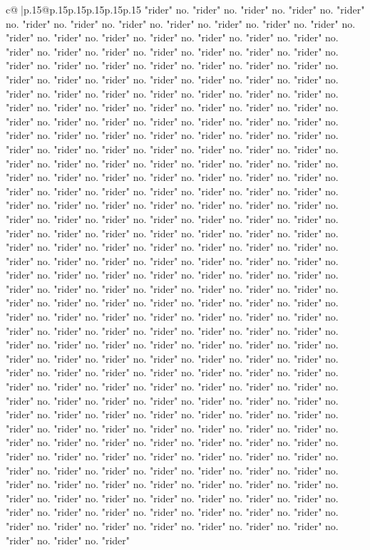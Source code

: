 \documentclass{article}
\begin{document}
{\begin{supertabular}{c@{$\;$}|p{.15\linewidth}@{}p{.15\linewidth}p{.15\linewidth}p{.15\linewidth}p{.15\linewidth}p{.15\linewidth}}
{{{"rider" no. "rider" no. "rider" no. "rider" no. "rider" no. "rider" no. "rider" no. "rider" no. "rider" no. "rider" no. "rider" no. "rider" no. "rider" no. "rider" no. "rider" no. "rider" no. "rider" no. "rider" no. "rider" no. "rider" no. "rider" no. "rider" no. "rider" no. "rider" no. "rider" no. "rider" no. "rider" no. "rider" no. "rider" no. "rider" no. "rider" no. "rider" no. "rider" no. "rider" no. "rider" no. "rider" no. "rider" no. "rider" no. "rider" no. "rider" no. "rider" no. "rider" no. "rider" no. "rider" no. "rider" no. "rider" no. "rider" no. "rider" no. "rider" no. "rider" no. "rider" no. "rider" no. "rider" no. "rider" no. "rider" no. "rider" no. "rider" no. "rider" no. "rider" no. "rider" no. "rider" no. "rider" no. "rider" no. "rider" no. "rider" no. "rider" no. "rider" no. "rider" no. "rider" no. "rider" no. "rider" no. "rider" no. "rider" no. "rider" no. "rider" no. "rider" no. "rider" no. "rider" no. "rider" no. "rider" no. "rider" no. "rider" no. "rider" no. "rider" no. "rider" no. "rider" no. "rider" no. "rider" no. "rider" no. "rider" no. "rider" no. "rider" no. "rider" no. "rider" no. "rider" no. "rider" no. "rider" no. "rider" no. "rider" no. "rider" no. "rider" no. "rider" no. "rider" no. "rider" no. "rider" no. "rider" no. "rider" no. "rider" no. "rider" no. "rider" no. "rider" no. "rider" no. "rider" no. "rider" no. "rider" no. "rider" no. "rider" no. "rider" no. "rider" no. "rider" no. "rider" no. "rider" no. "rider" no. "rider" no. "rider" no. "rider" no. "rider" no. "rider" no. "rider" no. "rider" no. "rider" no. "rider" no. "rider" no. "rider" no. "rider" no. "rider" no. "rider" no. "rider" no. "rider" no. "rider" no. "rider" no. "rider" no. "rider" no. "rider" no. "rider" no. "rider" no. "rider" no. "rider" no. "rider" no. "rider" no. "rider" no. "rider" no. "rider" no. "rider" no. "rider" no. "rider" no. "rider" no. "rider" no. "rider" no. "rider" no. "rider" no. "rider" no. "rider" no. "rider" no. "rider" no. "rider" no. "rider" no. "rider" no. "rider" no. "rider" no. "rider" no. "rider" no. "rider" no. "rider" no. "rider" no. "rider" no. "rider" no. "rider" no. "rider" no. "rider" no. "rider" no. "rider" no. "rider" no. "rider" no. "rider" no. "rider" no. "rider" no. "rider" no. "rider" no. "rider" no. "rider" no. "rider" no. "rider" no. "rider" no. "rider" no. "rider" no. "rider" no. "rider" no. "rider" no. "rider" no. "rider" no. "rider" no. "rider" no. "rider" no. "rider" no. "rider" no. "rider" no. "rider" no. "rider" no. "rider" no. "rider" no. "rider" no. "rider" no. "rider" no. "rider" no. "rider" no. "rider" no. "rider" no. "rider" no. "rider" no. "rider" no. "rider" no. "rider" no. "rider" no. "rider" no. "rider" no. "rider" no. "rider" no. "rider" no. "rider" no. "rider" no. "rider" no. "rider" no. "rider" no. "rider" no. "rider" no. "rider" no. "rider" no. "rider" no. "rider" no. "rider" no. "rider" no. "rider" no. "rider" no. "rider" no. "rider" no. "rider" no. "rider" no. "rider" no. "rider" no. "rider" no. "rider" no. "rider" no. "rider" no. "rider" no. "rider" no. "rider" no. "rider" no. "rider" no. "rider" no. "rider" no. "rider" no. "rider" no. "rider" no. "rider" no. "rider" no. "rider" }}}
\end{supertabular}}
\end{document}
